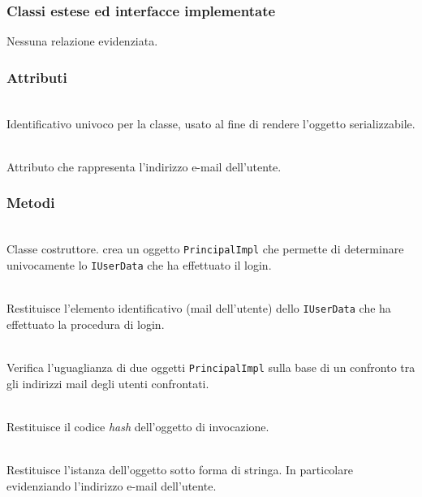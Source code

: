 \subsubsection*{Classi estese ed interfacce implementate}

Nessuna relazione evidenziata.

\subsubsection*{Attributi}
\begin{description}
  \item{}\\
  Identificativo univoco per la classe, usato al fine di rendere l'oggetto serializzabile.
  \item{}\\
  Attributo che rappresenta l'indirizzo e-mail dell'utente.
\end{description}

\subsubsection*{Metodi}
\begin{description}
	\item{}\\
	Classe costruttore. crea un oggetto \texttt{PrincipalImpl} che permette di determinare univocamente lo \texttt{IUserData} che ha effettuato il login.
	\item{}\\
	Restituisce l'elemento identificativo (mail dell'utente) dello \texttt{IUserData} che ha effettuato la procedura di login.
	\item{}\\
	Verifica l'uguaglianza di due oggetti \texttt{PrincipalImpl} sulla base di un confronto tra gli indirizzi mail degli utenti confrontati.
	\item{}\\
	Restituisce il codice \textit{hash} dell'oggetto di invocazione.				\item{}\\
	Restituisce l'istanza dell'oggetto sotto forma di stringa. In particolare evidenziando l'indirizzo e-mail dell'utente.
\end{description}

